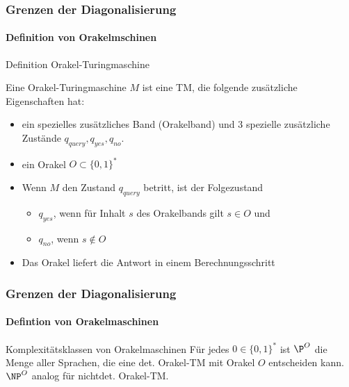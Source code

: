 \begin{frame}
	\frametitle{Grenzen der Diagonalisierung}
	\framesubtitle{Definition von Orakelmschinen}
	\begin{KITinfoblock}{Definition Orakel-Turingmaschine} {
			Eine Orakel-Turingmaschine $M$ ist eine TM, die folgende zusätzliche Eigenschaften hat:
			\begin{itemize}
				\item<2-> ein spezielles zusätzliches Band (Orakelband) und 3 spezielle zusätzliche Zustände $q_{query}, q_{yes}, q_{no}$.
				\item <3-> ein Orakel $O \subset \{0,1\}^*$
				\item <4-> Wenn $M$ den Zustand $q_{query}$ betritt, ist der Folgezustand
					\begin{itemize}
					\item $q_{yes}$, wenn für Inhalt $s$ des Orakelbands gilt $s \in O$ und
				    \item	$q_{no}$, wenn  $s \notin O$ 
					\end{itemize} 
				\item<5-> Das Orakel liefert die Antwort \alert{in einem Berechnungsschritt}
			\end{itemize}
		}
	\end{KITinfoblock}
\end{frame}
\begin{frame} 
	\frametitle{Grenzen der Diagonalisierung}
	\framesubtitle{Defintion von Orakelmaschinen}
	\begin{KITinfoblock}{Komplexitätsklassen von Orakelmaschinen}
		Für jedes $0 \in \{0,1\}^*$ ist ${\P}^O$ die Menge aller Sprachen, die eine det. Orakel-TM mit Orakel $O$ entscheiden kann.
		${\NP}^O$ analog für nichtdet. Orakel-TM.
		
	\end{KITinfoblock}
\end{frame}

